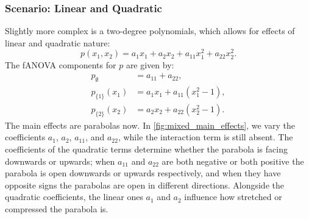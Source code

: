 \subsubsection{Scenario: Linear and Quadratic}
Slightly more complex is a two-degree polynomials, which allows for effects of linear and quadratic nature:
\[
p(x_1, x_2) = a_1 x_1 + a_2 x_2 + a_{11} x_1^2 + a_{22} x_2^2.
\]
The fANOVA components for $p$ are given by:
\begin{align*}
    p_{\emptyset} &= a_{11} + a_{22}, \\
    p_{\{1\}}(x_1) &= a_1 x_1 + a_{11}(x_1^2 - 1), \\
    p_{\{2\}}(x_2) &= a_2 x_2 + a_{22}(x_2^2 - 1).
\end{align*}
The main effects are parabolas now. In \autoref{fig:mixed_main_effects}, we vary the coefficients $a_1$, $a_2$, $a_{11}$, and $a_{22}$, while the interaction term is still absent.
The coefficients of the quadratic terms determine whether the parabola is facing downwards or upwards; when $a_{11}$ and $a_{22}$ are both negative or both positive the parabola is open downwards or upwards respectively, and when they have opposite signs the parabolas are open in different directions. Alongside the quadratic coefficients, the linear ones $a_1$ and $a_2$ influence how stretched or compressed the parabola is.

